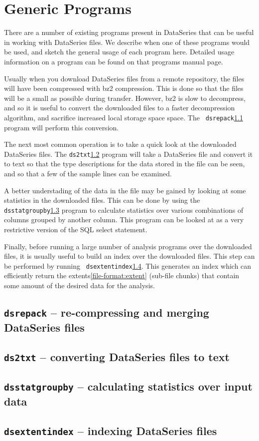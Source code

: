 \chapter{Generic Programs}\label{chap:programs}

There are a number of existing programs present in DataSeries that can
be useful in working with DataSeries files.  We describe when one of
these programs would be used, and sketch the general usage of each
program here.  Detailed usage information on a program can be found on
that programs manual page.

Usually when you download DataSeries files from a remote repository,
the files will have been compressed with bz2\cite{BZIP2} compression.
This is done so that the files will be a small as possible during
transfer. However, bz2 is slow to decompress, and so it is useful to
convert the downloaded files to a faster decompression algorithm, and
sacrifice increased local storage space space.  The {\tt
dsrepack}\ref{program:dsrepack} program will perform this conversion.

The next most common operation is to take a quick look at the
downloaded DataSeries files.  The {\tt ds2txt}\ref{program:ds2txt}
program will take a DataSeries file and convert it to text so that the
type descriptions for the data stored in the file can be seen, and so
that a few of the sample lines can be examined.

A better understading of the data in the file may be gained by looking
at some statistics in the downloaded files.  This can be done by using
the {\tt dsstatgroupby}\ref{program:dsstatgroupby} program to
calculate statistics over various combinations of columns grouped by
another column.  This program can be looked at as a very restrictive
version of the SQL select statement.

Finally, before running a large number of analysis programs over the
downloaded files, it is usually useful to build an index over the
downloaded files.  This step can be performed by running {\tt
dsextentindex}\ref{program:dsextentindex}.  This generates an index
which can efficiently return the extents\ref{file-format:extent}
(sub-file chunks) that contain some amount of the desired data for the
analysis.

\section{{\tt dsrepack} -- re-compressing and merging DataSeries files}
\label{program:dsrepack}

\section{{\tt ds2txt} -- converting DataSeries files to text}
\label{program:ds2txt}

\section{{\tt dsstatgroupby} -- calculating statistics over input data}
\label{program:dsstatgroupby}

\section{{\tt dsextentindex} -- indexing DataSeries files}
\label{program:dsextentindex}


